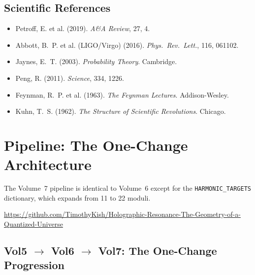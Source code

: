\documentclass[11pt, letterpaper, openany]{book}
\begin{document}
\section*{Scientific References}
\begin{itemize}
    \item Petroff, E. et al. (2019). \textit{A\&A Review}, 27, 4.
    \item Abbott, B.~P. et al. (LIGO/Virgo) (2016). \textit{Phys.~Rev.~Lett.}, 116, 061102.
    \item Jaynes, E.~T. (2003). \textit{Probability Theory}. Cambridge.
    \item Peng, R. (2011). \textit{Science}, 334, 1226.
    \item Feynman, R.~P. et al. (1963). \textit{The Feynman Lectures}. Addison-Wesley.
    \item Kuhn, T.~S. (1962). \textit{The Structure of Scientific Revolutions}. Chicago.
\end{itemize}

\appendix
\chapter{Pipeline: The One-Change Architecture}

The Volume~7 pipeline is identical to Volume~6 except for the \texttt{HARMONIC\_TARGETS}
dictionary, which expands from 11 to 22 moduli.

\begin{center}
\url{https://github.com/TimothyKish/Holographic-Resonance-The-Geometry-of-a-Quantized-Universe}
\end{center}

\section{Vol5 $\to$ Vol6 $\to$ Vol7: The One-Change Progression}
\end{document}
